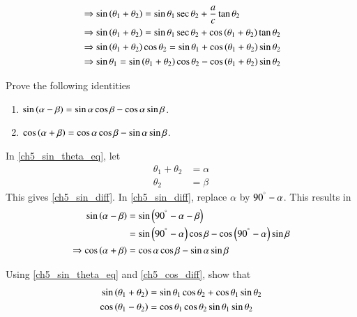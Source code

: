 \begin{align}	
&\Rightarrow \sin\left(\theta_1 + \theta_2\right) =  \sin{\theta_1} \sec \theta_2 + \frac{a}{c} \tan{\theta_2} \\
&\Rightarrow \sin\left(\theta_1 + \theta_2\right) =  \sin{\theta_1} \sec \theta_2 + \cos\left(\theta_1 + \theta_2\right) \tan{\theta_2} \\
&\Rightarrow \sin\left(\theta_1 + \theta_2\right)\cos{\theta_2} =  \sin{\theta_1}  + \cos\left(\theta_1 + \theta_2\right) \sin\theta_2  \\
&\Rightarrow \sin \theta_1 = \sin\left(\theta_1 + \theta_2\right)\cos{\theta_2} - \cos\left(\theta_1 + \theta_2\right) \sin\theta_2 
\end{align}
%
\begin{problem}
	Prove the following identities 
	\begin{enumerate}
		\label{ch5_sin_diff}
\item $\sin\left(\alpha - \beta\right) = \sin \alpha \cos \beta - \cos \alpha \sin \beta$.
\item $\cos\left(\alpha + \beta\right) = \cos \alpha \cos \beta - \sin \alpha \sin \beta$.
		\label{ch5_cos_diff}
	\end{enumerate}
\end{problem}
\proof In \eqref{ch5_sin_theta_eq}, let
%
\begin{equation}
\begin{split}
\theta_1 + \theta_2 &= \alpha \\
\theta_2 &=  \beta
\end{split}
\end{equation}
%
This gives \eqref{ch5_sin_diff}.  In \eqref{ch5_sin_diff}, replace $\alpha$ by 
%
$90^{\degree} - \alpha$.  This results in
%
\begin{align}
\sin\left(\alpha - \beta\right) &= \sin\left(90^{\degree} - \alpha - \beta\right)
\\
&=
\sin \left(90^{\degree} -\alpha\right) \cos \beta - \cos \left(90^{\degree} -\alpha\right) \sin \beta \\
\Rightarrow \cos\left(\alpha + \beta\right) &= \cos \alpha \cos \beta - \sin \alpha \sin \beta
\end{align}
% 
\begin{problem}
	Using \eqref{ch5_sin_theta_eq} and \eqref{ch5_cos_diff}, show that
\begin{align}
\label{ch5_sin_sum}
\sin\left(\theta_1 + \theta_2\right) &= \sin\theta_1  \cos\theta_2 + \cos\theta_1\sin\theta_2
\\
\cos\left(\theta_1 - \theta_2\right) &= \cos\theta_1  \cos\theta_2  \sin\theta_1\sin\theta_2
\label{ch5_cos_sum}
\end{align}
\end{problem}
